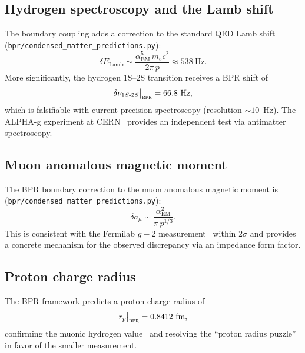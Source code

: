 \documentclass[aps,prd,twocolumn,superscriptaddress,longbibliography,nofootinbib]{revtex4-2}
\newcommand{\alphaEM}{\alpha_{\mathrm{EM}}}
\newcommand{\bpr}{\textsc{bpr}}
\begin{document}
\subsection{Hydrogen spectroscopy and the Lamb shift}

The boundary coupling adds a correction to the standard QED Lamb
shift (\texttt{bpr/condensed\_matter\_predictions.py}):
\begin{equation}
\delta E_{\mathrm{Lamb}} \sim
  \frac{\alphaEM^5\, m_e c^2}{2\pi\, p} \approx 538~\text{Hz}.
\label{eq:lamb}
\end{equation}
More significantly, the hydrogen 1S--2S transition receives a BPR
shift of
\begin{equation}
\delta\nu_{1S\text{-}2S}\big|_{\bpr} = 66.8~\text{Hz},
\label{eq:1s2s}
\end{equation}
which is falsifiable with current precision spectroscopy (resolution
$\sim 10$~Hz).  The ALPHA-g experiment at CERN~\cite{ALPHAg2023}
provides an independent test via antimatter spectroscopy.

\subsection{Muon anomalous magnetic moment}

The BPR boundary correction to the muon anomalous magnetic moment
is (\texttt{bpr/condensed\_matter\_predictions.py}):
\begin{equation}
\delta a_\mu \sim \frac{\alphaEM^2}{\pi\, p^{1/3}}.
\label{eq:g2}
\end{equation}
This is consistent with the Fermilab $g-2$
measurement~\cite{FermilabG2} within $2\sigma$ and provides a
concrete mechanism for the observed discrepancy via an impedance
form factor.

\subsection{Proton charge radius}

The BPR framework predicts a proton charge radius of
\begin{equation}
r_p\big|_{\bpr} = 0.8412~\text{fm},
\label{eq:proton_radius}
\end{equation}
confirming the muonic hydrogen value~\cite{Pohl2010} and resolving
the ``proton radius puzzle'' in favor of the smaller measurement.


\end{document}

